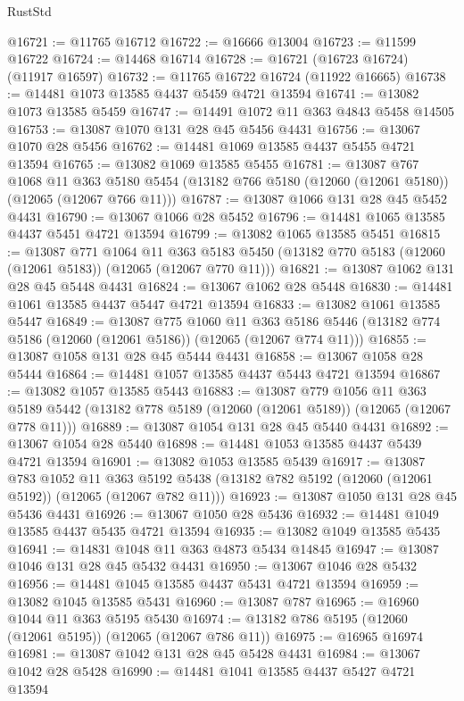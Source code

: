 \begin{lexlean}{RustStd}
\begin{coremodule}
@16721 := @11765 @16712
@16722 := @16666 @13004
@16723 := @11599 @16722
@16724 := @14468 @16714
@16728 := @16721 (@16723 @16724) (@11917 @16597)
@16732 := @11765 @16722 @16724 (@11922 @16665)
@16738 := @14481 @1073 @13585 @4437 @5459 @4721 @13594
@16741 := @13082 @1073 @13585 @5459
@16747 := @14491 @1072 @11 @363 @4843 @5458 @14505
@16753 := @13087 @1070 @131 @28 @45 @5456 @4431
@16756 := @13067 @1070 @28 @5456
@16762 := @14481 @1069 @13585 @4437 @5455 @4721 @13594
@16765 := @13082 @1069 @13585 @5455
@16781 := @13087
    @767
    @1068
    @11
    @363
    @5180
    @5454
    (@13182 @766 @5180 (@12060 (@12061 @5180)) (@12065 (@12067 @766 @11)))
@16787 := @13087 @1066 @131 @28 @45 @5452 @4431
@16790 := @13067 @1066 @28 @5452
@16796 := @14481 @1065 @13585 @4437 @5451 @4721 @13594
@16799 := @13082 @1065 @13585 @5451
@16815 := @13087
    @771
    @1064
    @11
    @363
    @5183
    @5450
    (@13182 @770 @5183 (@12060 (@12061 @5183)) (@12065 (@12067 @770 @11)))
@16821 := @13087 @1062 @131 @28 @45 @5448 @4431
@16824 := @13067 @1062 @28 @5448
@16830 := @14481 @1061 @13585 @4437 @5447 @4721 @13594
@16833 := @13082 @1061 @13585 @5447
@16849 := @13087
    @775
    @1060
    @11
    @363
    @5186
    @5446
    (@13182 @774 @5186 (@12060 (@12061 @5186)) (@12065 (@12067 @774 @11)))
@16855 := @13087 @1058 @131 @28 @45 @5444 @4431
@16858 := @13067 @1058 @28 @5444
@16864 := @14481 @1057 @13585 @4437 @5443 @4721 @13594
@16867 := @13082 @1057 @13585 @5443
@16883 := @13087
    @779
    @1056
    @11
    @363
    @5189
    @5442
    (@13182 @778 @5189 (@12060 (@12061 @5189)) (@12065 (@12067 @778 @11)))
@16889 := @13087 @1054 @131 @28 @45 @5440 @4431
@16892 := @13067 @1054 @28 @5440
@16898 := @14481 @1053 @13585 @4437 @5439 @4721 @13594
@16901 := @13082 @1053 @13585 @5439
@16917 := @13087
    @783
    @1052
    @11
    @363
    @5192
    @5438
    (@13182 @782 @5192 (@12060 (@12061 @5192)) (@12065 (@12067 @782 @11)))
@16923 := @13087 @1050 @131 @28 @45 @5436 @4431
@16926 := @13067 @1050 @28 @5436
@16932 := @14481 @1049 @13585 @4437 @5435 @4721 @13594
@16935 := @13082 @1049 @13585 @5435
@16941 := @14831 @1048 @11 @363 @4873 @5434 @14845
@16947 := @13087 @1046 @131 @28 @45 @5432 @4431
@16950 := @13067 @1046 @28 @5432
@16956 := @14481 @1045 @13585 @4437 @5431 @4721 @13594
@16959 := @13082 @1045 @13585 @5431
@16960 := @13087 @787
@16965 := @16960 @1044 @11 @363 @5195 @5430
@16974 := @13182 @786 @5195 (@12060 (@12061 @5195)) (@12065 (@12067 @786 @11))
@16975 := @16965 @16974
@16981 := @13087 @1042 @131 @28 @45 @5428 @4431
@16984 := @13067 @1042 @28 @5428
@16990 := @14481 @1041 @13585 @4437 @5427 @4721 @13594

\end{coremodule}
\end{lexlean}
